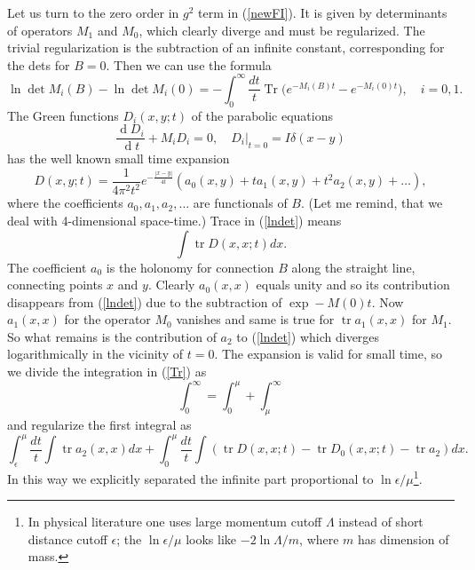 \documentclass[12pt]{article}
\DeclareMathOperator{\tr}{tr}
\DeclareMathOperator{\Tr}{Tr}
\DeclareMathOperator{\dd}{d}
\begin{document}
	Let us turn to the zero order in 
    $ g^{2} $
	term in
(\ref{newFI}).
	It is given by determinants of operators
    $ M_{1} $ and
    $ M_{0} $,
	which clearly diverge and must be regularized.
	The trivial regularization is the subtraction of an infinite
	constant, corresponding for the dets for
    $ B=0 $.
	Then we can use the formula
\begin{equation}
\label{lndet}
    \ln \det M_{i} (B) - \ln \det M_{i}(0) = - \int_{0}^{\infty}
	\frac{dt}{t} \Tr \bigl(e^{-M_{i}(B)t} - e^{-M_{i}(0)t}\bigr) ,
	\quad i=0,1 .
\end{equation}
	The Green functions
    $ D_{i}(x,y;t) $
	of the parabolic equations
\begin{equation}
    \frac{\dd D_{i}}{\dd t} + M_{i} D_{i} = 0, \quad
	D_{i} |_{t=0} = I \delta(x-y)
\end{equation}
	has the well known small time expansion
\begin{equation*}
    D(x,y;t) = \frac{1}{4\pi^{2}t^{2}} e^{- \frac{|x-y|}{4t}}
	(a_{0}(x,y) + t a_{1}(x,y) +t^{2} a_{2}(x,y) + \ldots) ,
\end{equation*}
	where the coefficients
    $ a_{0}, a_{1}, a_{2}, \ldots $
	are functionals of 
    $ B $.
	(Let me remind, that we deal with 4-dimensional space-time.)
	Trace in
(\ref{lndet})
	means
\begin{equation}
\label{Tr}
    \int \tr D(x,x;t) dx .
\end{equation}
	The coefficient
    $ a_{0} $
	is the holonomy for connection
    $ B $
	along the straight line, connecting points
    $ x $
	and
    $ y $.
	Clearly
    $ a_{0}(x,x) $
	equals unity and so its contribution disappears from
(\ref{lndet})
	due to the subtraction of 
    $ \exp - M(0) t $.
	Now
    $ a_{1}(x,x) $
	for the operator
    $ M_{0} $
	vanishes and same is true for
    $ \tr a_{1}(x,x) $
	for
    $ M_{1} $.
	So what remains is the contribution of 
    $ a_{2} $
	to
(\ref{lndet})
	which diverges logarithmically in the vicinity of 
    $ t=0 $.
	The expansion is valid for small time, so we divide
	the integration in
(\ref{Tr}) as
\begin{equation}
    \int_{0}^{\infty} = \int_{0}^{\mu} + \int_{\mu}^{\infty}
\end{equation}
	and regularize the first integral as
\begin{equation}
    \int_{\epsilon}^{\mu} \frac{dt}{t} \int \tr a_{2}(x,x) dx +
	\int_{0}^{\mu} \frac{dt}{t} \int (\tr D(x,x;t)
	    - \tr D_{0}(x,x;t) - \tr a_{2}) dx .
\end{equation}
	In this way we explicitly separated the infinite part
	proportional to
    $ \ln \epsilon /\mu $\footnote{
In physical literature one uses large momentum cutoff
    $ \Lambda $
instead of short distance cutoff
    $ \epsilon $;
the
    $ \ln \epsilon/\mu $
looks like
    $ -2 \ln \Lambda/m $,
where
    $ m $
has dimension of mass.}.
\end{document}
